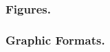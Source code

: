 \documentclass[letterpaper, preprint, paper,11pt]{AAS}	%
\begin{document}
\subsubsection{Figures.}   


\subsubsection{Graphic Formats.} 
\end{document}
